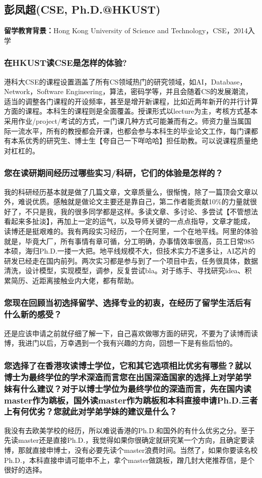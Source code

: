 \documentclass[a4paper,UTF8]{book}
\begin{document}
\subsection{彭凤超(CSE, Ph.D.@HKUST)}
    \textbf{留学教育背景：}Hong Kong University of Science and Technology，CSE，2014入学

    \subsubsection*{在HKUST读CSE是怎样的体验?}
    港科大CSE的课程设置涵盖了所有CS领域热门的研究领域，如AI，Database，Network，Software Engineering，算法，密码学等，并且会随着CS的发展潮流，适当的调整各门课程的开设频率，甚至是增开新课程，比如近两年新开的并行计算方面的课程。本科生的课程则是全面覆盖。授课形式以lecture为主，考核方式基本采用作业/project/考试的方式，一门课几种方式可能兼而有之。师资力量当属国际一流水平，所有的教授都会开课，也都会参与本科生的毕业论文工作，每门课都有本系优秀的研究生、博士生【夸自己一下咩哈哈】担任助教。可以说课程质量绝对杠杠的。
    \subsubsection*{您在读研期间经历过哪些实习/科研，它们的体验是怎样的？}
    我的科研经历基本就是做了几篇文章，文章质量么，很惭愧，除了一篇顶会文章以外，难说优质。感触就是做论文主要还是靠自己，第二作者能贡献10\%的力量就很好了，不只是我，我的很多同学都是这样。多读文章、多讨论、多尝试【不管想法看起来多扯淡】，再加上一定的运气，以及导师关键的一点点指导，文章才能成，读博还是挺艰难的。我有两段实习经历，一个在阿里，一个在地平线。阿里的体验就是，毕竟大厂，所有事情有章可循，分工明确，办事情效率很高，员工日常985本硕，海归Ph.D.一搂一大把。地平线规模不大，但技术实力不遑多让，AI芯片的研发已经走在国内前列。两次实习都是参与到了一个项目中去，任务很具体，数据清洗，设计模型，实现模型，调参，反复尝试bla。对于练手、寻找研究idea、积累简历、近距离接触业内大佬，都有帮助。
    \subsubsection*{您现在回顾当初选择留学、选择专业的初衷，在经历了留学生活后有什么新的感受？}
    还是应该申请之前就仔细了解一下，自己喜欢做哪方面的研究，不要为了读博而读博，我进门以后，万幸遇到一个我有兴趣的方向，回想一下是有些后怕的。
    \subsubsection*{您选择了在香港攻读博士学位，它和其它选项相比优劣有哪些？就以博士为最终学位的学术深造而言您在出国深造国家的选择上对学弟学妹有什么建议？对于以博士学位为最终学位的深造而言，先在国内读master作为跳板，国外读master作为跳板和本科直接申请Ph.D.三者上有何优劣？您就此对学弟学妹的建议是什么？}
    我没有去欧美学校的经历，所以难说香港的Ph.D.和国外的有什么优劣之分。至于先读master还是直接Ph.D.，我觉得如果你很确定就研究某一个方向，且确定要读博，那就直接申博士，没有必要先读个master浪费时间。当然了，如果你要读名校Ph.D.，本科直接申请可能申不上，拿个master做跳板，蹭几封大佬推荐信，是个很好的选择。
\end{document}
